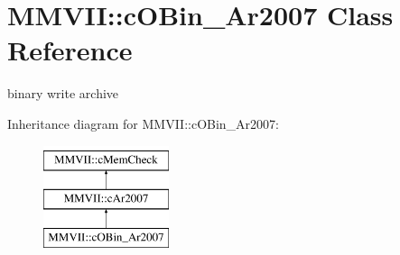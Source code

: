 \hypertarget{classMMVII_1_1cOBin__Ar2007}{}\section{M\+M\+V\+II\+:\+:c\+O\+Bin\+\_\+\+Ar2007 Class Reference}
\label{classMMVII_1_1cOBin__Ar2007}


binary write archive  


Inheritance diagram for M\+M\+V\+II\+:\+:c\+O\+Bin\+\_\+\+Ar2007\+:\begin{figure}[H]
\begin{center}
\leavevmode
\includegraphics[height=3.000000cm]{classMMVII_1_1cOBin__Ar2007}
\end{center}
\end{figure}
